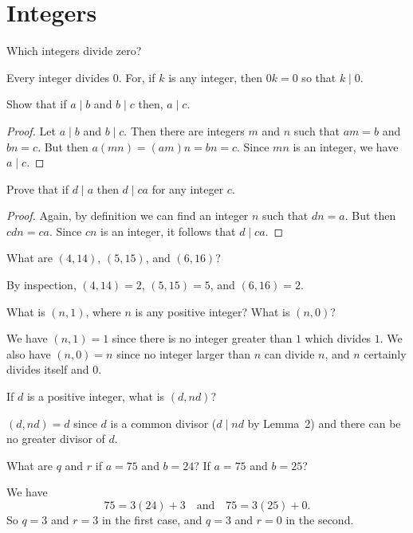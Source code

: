 \chapter{Integers}

 Which integers divide zero?
\begin{solution}
  Every integer divides $0$. For, if $k$ is any integer, then $0k = 0$
  so that $k\mid0$.
\end{solution}

 Show that if $a\mid b$ and $b\mid c$ then, $a\mid c$.
\begin{proof}
  Let $a\mid b$ and $b\mid c$. Then there are integers $m$ and $n$
  such that $am = b$ and $bn = c$. But then $a(mn) = (am)n = bn =
  c$. Since $mn$ is an integer, we have $a\mid c$.
\end{proof}

 Prove that if $d\mid a$ then $d\mid ca$ for any integer $c$.
\begin{proof}
  Again, by definition we can find an integer $n$ such that $dn =
  a$. But then $cdn = ca$. Since $cn$ is an integer, it follows that
  $d\mid ca$.
\end{proof}

 What are $(4,14)$, $(5,15)$, and $(6,16)$?
\begin{solution}
  By inspection, $(4,14) = 2$, $(5,15) = 5$, and $(6,16) = 2$.
\end{solution}

 What is $(n,1)$, where $n$ is any positive integer? What is
$(n,0)$?
\begin{solution}
  We have $(n,1) = 1$ since there is no integer greater than $1$ which
  divides $1$. We also have $(n,0) = n$ since no integer larger than
  $n$ can divide $n$, and $n$ certainly divides itself and $0$.
\end{solution}

 If $d$ is a positive integer, what is $(d, nd)$?
\begin{solution}
  $(d,nd) = d$ since $d$ is a common divisor ($d\mid nd$ by Lemma~2)
  and there can be no greater divisor of $d$.
\end{solution}

 What are $q$ and $r$ if $a = 75$ and $b = 24$? If $a = 75$
and $b = 25$?
\begin{solution}
  We have
  \begin{equation*}
    75 = 3(24) + 3
    \quad\text{and}\quad
    75 = 3(25) + 0.
  \end{equation*}
  So $q = 3$ and $r = 3$ in the first case, and $q = 3$ and $r = 0$ in
  the second.
\end{solution}
